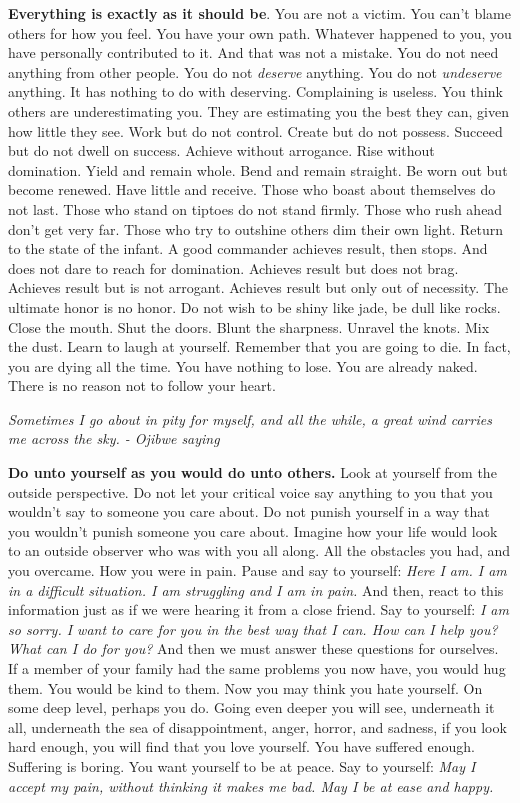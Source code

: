 \documentclass[a4paper,hidelinks]{article}
\begin{document}
\textbf{Everything is exactly as it should be}.
You are not a victim.
You can't blame others for how you feel.
You have your own path.
Whatever happened to you, you have personally contributed to it.
And that was not a mistake.
You do not need anything from other people.
You do not \textit{deserve} anything.
You do not \textit{undeserve} anything.
It has nothing to do with deserving.
Complaining is useless.
You think others are underestimating you.
They are estimating you the best they can, given how little they see.
Work but do not control.
Create but do not possess.
Succeed but do not dwell on success.
Achieve without arrogance.
Rise without domination.
Yield and remain whole.
Bend and remain straight.
Be worn out but become renewed.
Have little and receive.
Those who boast about themselves do not last.
Those who stand on tiptoes do not stand firmly.
Those who rush ahead don't get very far.
Those who try to outshine others dim their own light.
Return to the state of the infant.
A good commander achieves result, then stops.
And does not dare to reach for domination.
Achieves result but does not brag.
Achieves result but is not arrogant.
Achieves result but only out of necessity.
The ultimate honor is no honor.
Do not wish to be shiny like jade, be dull like rocks.
Close the mouth.
Shut the doors.
Blunt the sharpness.
Unravel the knots.
Mix the dust.
Learn to laugh at yourself.
Remember that you are going to die.
In fact, you are dying all the time.
You have nothing to lose.
You are already naked.
There is no reason not to follow your heart.

\newpage

\begin{center}
\textit{
Sometimes I go about in pity for myself, and all the while, a great wind carries me across the sky. - Ojibwe saying
}
\end{center}

\textbf{Do unto yourself as you would do unto others.}
Look at yourself from the outside perspective.
Do not let your critical voice say anything to you that you wouldn’t say to someone you care about.
Do not punish yourself in a way that you wouldn’t punish someone you care about.
Imagine how your life would look to an outside observer who was with you all along.
All the obstacles you had, and you overcame.
How you were in pain.
Pause and say to yourself:
\textit{
Here I am.
I am in a difficult situation.
I am struggling and I am in pain.
}
And then, react to this information just as if we were hearing it from a close friend.
Say to yourself:
\textit{
I am so sorry.
I want to care for you in the best way that I can.
How can I help you? What can I do for you?
}
And then we must answer these questions for ourselves.
If a member of your family had the same problems you now have, you would hug them.
You would be kind to them.
Now you may think you hate yourself.
On some deep level, perhaps you do.
Going even deeper you will see, underneath it all, underneath the sea of disappointment, anger, horror, and sadness, if you look hard enough, you will find that you love yourself.
You have suffered enough.
Suffering is boring.
You want yourself to be at peace.
Say to yourself:
\textit{
May I accept my pain, without thinking it makes me bad.
May I be at ease and happy.
}
\end{document}
